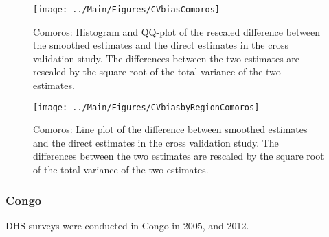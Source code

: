 \documentclass[12pt]{article}\usepackage[]{graphicx}\usepackage[]{color}
\newenvironment{knitrout}{}{} %
\begin{document}
\begin{knitrout}
\color{fgcolor}\begin{figure}[bht]

{\centering \texttt{[image: ../Main/Figures/CVbiasComoros]} 

}

\caption[Comoros]{Comoros: Histogram and QQ-plot of the rescaled difference between the smoothed estimates and the direct estimates in the cross validation study. The differences between the two estimates are rescaled by the square root of the total variance of the two estimates.}\label{fig:unnamed-chunk-69}
\end{figure}


\end{knitrout}

\begin{knitrout}
\color{fgcolor}\begin{figure}[bht]

{\centering \texttt{[image: ../Main/Figures/CVbiasbyRegionComoros]} 

}

\caption[Comoros]{Comoros: Line plot of the difference between smoothed estimates and the direct estimates in the cross validation study. The differences between the two estimates are rescaled by the square root of the total variance of the two estimates.}\label{fig:unnamed-chunk-70}
\end{figure}


\end{knitrout}

\clearpage
\subsubsection{Congo}





DHS surveys were conducted in Congo in 2005, and 2012.
\end{document}

